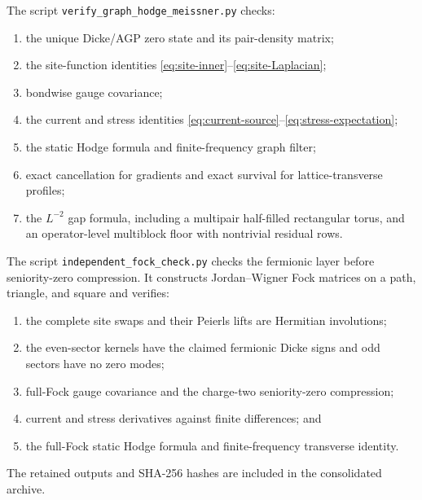 \documentclass[11pt]{article}
\theoremstyle{definition}
\theoremstyle{remark}
\begin{document}
The script \texttt{verify\_graph\_hodge\_meissner.py} checks:
\begin{enumerate}[leftmargin=1.6em]
\item the unique Dicke/AGP zero state and its pair-density matrix;
\item the site-function identities \eqref{eq:site-inner}--\eqref{eq:site-Laplacian};
\item bondwise gauge covariance;
\item the current and stress identities \eqref{eq:current-source}--\eqref{eq:stress-expectation};
\item the static Hodge formula and finite-frequency graph filter;
\item exact cancellation for gradients and exact survival for lattice-transverse profiles;
\item the $L^{-2}$ gap formula, including a multipair half-filled rectangular torus, and an operator-level multiblock floor with nontrivial residual rows.
\end{enumerate}

The script \texttt{independent\_fock\_check.py} checks the fermionic layer before seniority-zero
compression.  It constructs Jordan--Wigner Fock matrices on a path, triangle, and square and verifies:
\begin{enumerate}[leftmargin=1.6em]
\item the complete site swaps and their Peierls lifts are Hermitian involutions;
\item the even-sector kernels have the claimed fermionic Dicke signs and odd sectors have no zero modes;
\item full-Fock gauge covariance and the charge-two seniority-zero compression;
\item current and stress derivatives against finite differences; and
\item the full-Fock static Hodge formula and finite-frequency transverse identity.
\end{enumerate}
The retained outputs and SHA-256 hashes are included in the consolidated archive.
\end{document}
